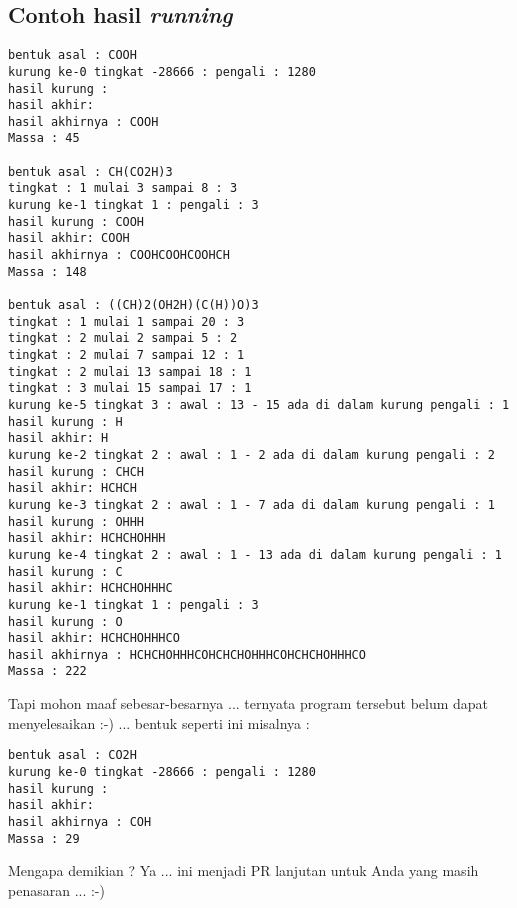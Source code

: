\documentclass[a4paper,10pt,makeidx]{article}
\begin{document}
\subsection{Contoh hasil {\itshape running}}
\begin{verbatim}
bentuk asal : COOH
kurung ke-0 tingkat -28666 : pengali : 1280
hasil kurung :
hasil akhir:
hasil akhirnya : COOH
Massa : 45

bentuk asal : CH(CO2H)3
tingkat : 1 mulai 3 sampai 8 : 3
kurung ke-1 tingkat 1 : pengali : 3
hasil kurung : COOH
hasil akhir: COOH
hasil akhirnya : COOHCOOHCOOHCH
Massa : 148

bentuk asal : ((CH)2(OH2H)(C(H))O)3
tingkat : 1 mulai 1 sampai 20 : 3
tingkat : 2 mulai 2 sampai 5 : 2
tingkat : 2 mulai 7 sampai 12 : 1
tingkat : 2 mulai 13 sampai 18 : 1
tingkat : 3 mulai 15 sampai 17 : 1
kurung ke-5 tingkat 3 : awal : 13 - 15 ada di dalam kurung pengali : 1
hasil kurung : H
hasil akhir: H
kurung ke-2 tingkat 2 : awal : 1 - 2 ada di dalam kurung pengali : 2
hasil kurung : CHCH
hasil akhir: HCHCH
kurung ke-3 tingkat 2 : awal : 1 - 7 ada di dalam kurung pengali : 1
hasil kurung : OHHH
hasil akhir: HCHCHOHHH
kurung ke-4 tingkat 2 : awal : 1 - 13 ada di dalam kurung pengali : 1
hasil kurung : C
hasil akhir: HCHCHOHHHC
kurung ke-1 tingkat 1 : pengali : 3
hasil kurung : O
hasil akhir: HCHCHOHHHCO
hasil akhirnya : HCHCHOHHHCOHCHCHOHHHCOHCHCHOHHHCO
Massa : 222
\end{verbatim}
Tapi mohon maaf sebesar-besarnya ... ternyata program tersebut belum
dapat menyelesaikan :-) ... bentuk seperti ini misalnya :
\begin{verbatim}
bentuk asal : CO2H
kurung ke-0 tingkat -28666 : pengali : 1280
hasil kurung :
hasil akhir:
hasil akhirnya : COH
Massa : 29
\end{verbatim}
Mengapa demikian ? Ya ... ini menjadi PR lanjutan untuk Anda yang
masih penasaran ... :-)
\end{document}
